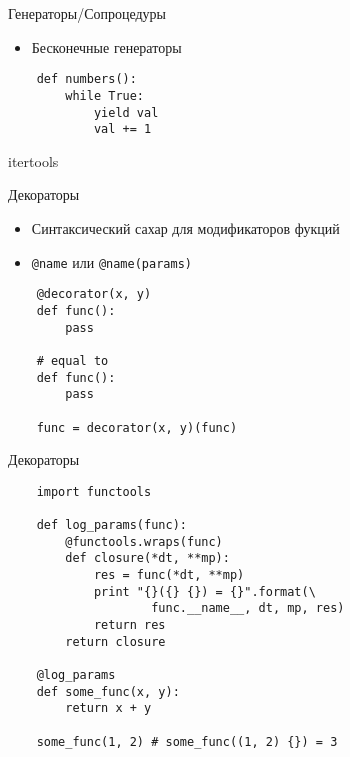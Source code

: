 \documentclass{article}
\begin{document}
\begin{center} Генераторы/Сопроцедуры \end{center}
\begin{itemize}
    \item Бесконечные генераторы
\end{itemize}
\vspace{15pt}
\begin{lstlisting}
    def numbers():
        while True:
            yield val
            val += 1
\end{lstlisting}
\newpage

\begin{center} itertools \end{center}
\newpage

\begin{center} Декораторы \end{center}
\begin{itemize}
    \item Синтаксический сахар для модификаторов фукций
    \item \lstinline!@name! или \lstinline!@name(params)!
\end{itemize}
\vspace{15pt}
\begin{lstlisting}
    @decorator(x, y)
    def func():
        pass

    # equal to
    def func():
        pass

    func = decorator(x, y)(func)
\end{lstlisting}
\newpage

\begin{center} Декораторы \end{center}
\vspace{15pt}
\begin{lstlisting}
    import functools

    def log_params(func):
        @functools.wraps(func)
        def closure(*dt, **mp):
            res = func(*dt, **mp)
            print "{}({} {}) = {}".format(\
                    func.__name__, dt, mp, res)
            return res
        return closure

    @log_params
    def some_func(x, y):
        return x + y

    some_func(1, 2) # some_func((1, 2) {}) = 3
\end{lstlisting}
\newpage
\end{document}
